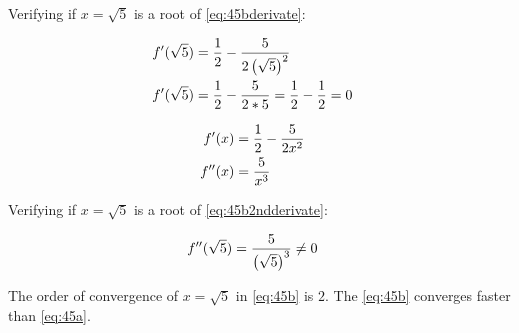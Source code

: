		Verifying if $x=\sqrt{5}$ is a root of \cref{eq:45bderivate}:

		\begin{align}
			f'(\sqrt{5}) &= \frac{1}{2} - \frac{5}{2\left(\sqrt{5}\right)^2}& \notag \\
			f'(\sqrt{5}) &= \frac{1}{2} - \frac{5}{2*5} = \frac{1}{2} - \frac{1}{2} = 0&
		\label{eq:44bderivatesqrt5x}
		\end{align}

		\begin{align}
			f'(x) &= \frac{1}{2} - \frac{5}{2x^2}& \notag \\
			f''(x) &= \frac{5}{x^3}&
		\label{eq:45b2ndderivate}
		\end{align}

		Verifying if $x=\sqrt{5}$ is a root of \cref{eq:45b2ndderivate}:

		\begin{align}
			f''(\sqrt{5}) &= \frac{5}{\left(\sqrt{5}\right)^3} \neq 0& \notag \\
		\label{eq:45b2ndderivatesqrt5x}
		\end{align}

		The order of convergence of $x = \sqrt{5}$ in \cref{eq:45b} is $2$. The \cref{eq:45b} converges faster than \cref{eq:45a}.